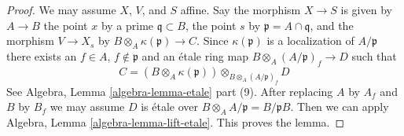 \documentclass[10pt,a4paper]{amsart}
\theoremstyle{plain}
\theoremstyle{definition}
\theoremstyle{remark}
\numberwithin{equation}{subsection}
\begin{document}
\begin{proof}
We may assume $X$, $V$, and $S$ affine. Say the morphism
$X \to S$ is given by $A \to B$ the point $x$ by a prime
$\mathfrak q \subset B$, the point $s$ by $\mathfrak p = A \cap \mathfrak q$,
and the morphism $V \to X_s$ by $B \otimes_A \kappa(\mathfrak p) \to C$.
Since $\kappa(\mathfrak p)$ is a localization of
$A/\mathfrak p$ there exists an $f \in A$, $f \not \in \mathfrak p$
and an \'etale ring map $B \otimes_A (A/\mathfrak p)_f \to D$
such that
$$
C = (B \otimes_A \kappa(\mathfrak p))
\otimes_{B \otimes_A (A/\mathfrak p)_f} D
$$
See Algebra, Lemma \ref{algebra-lemma-etale} part (9).
After replacing $A$ by $A_f$ and $B$ by $B_f$ we may assume
$D$ is \'etale over $B \otimes_A A/\mathfrak p = B/\mathfrak p B$.
Then we can apply Algebra, Lemma \ref{algebra-lemma-lift-etale}.
This proves the lemma.
\end{proof}
\end{document}
